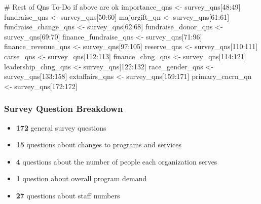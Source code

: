 \documentclass[
  letterpaper,
  DIV=11,
  numbers=noendperiod]{scrreprt}
\newenvironment{Shaded}{\begin{snugshade}}{\end{snugshade}}
\newcommand{\CommentTok}[1]{\textcolor[rgb]{0.37,0.37,0.37}{#1}}
\newcommand{\DecValTok}[1]{\textcolor[rgb]{0.68,0.00,0.00}{#1}}
\newcommand{\NormalTok}[1]{\textcolor[rgb]{0.00,0.23,0.31}{#1}}
\newcommand{\OtherTok}[1]{\textcolor[rgb]{0.00,0.23,0.31}{#1}}
\newcommand{\SpecialCharTok}[1]{\textcolor[rgb]{0.37,0.37,0.37}{#1}}
\providecommand{\tightlist}{%
  \setlength{\itemsep}{0pt}\setlength{\parskip}{0pt}}\usepackage{longtable,booktabs,array}
\begin{document}
\begin{Shaded}
\begin{Highlighting}[]
\CommentTok{\# Rest of Qns To{-}Do if above are ok}
\NormalTok{importance\_qns }\OtherTok{\textless{}{-}}\NormalTok{ survey\_qns[}\DecValTok{48}\SpecialCharTok{:}\DecValTok{49}\NormalTok{]}
\NormalTok{fundraise\_qns }\OtherTok{\textless{}{-}}\NormalTok{ survey\_qns[}\DecValTok{50}\SpecialCharTok{:}\DecValTok{60}\NormalTok{]}
\NormalTok{majorgift\_qn }\OtherTok{\textless{}{-}}\NormalTok{ survey\_qns[}\DecValTok{61}\SpecialCharTok{:}\DecValTok{61}\NormalTok{]}
\NormalTok{fundraise\_change\_qns }\OtherTok{\textless{}{-}}\NormalTok{ survey\_qns[}\DecValTok{62}\SpecialCharTok{:}\DecValTok{68}\NormalTok{]}
\NormalTok{fundraise\_donor\_qns }\OtherTok{\textless{}{-}}\NormalTok{ survey\_qns[}\DecValTok{69}\SpecialCharTok{:}\DecValTok{70}\NormalTok{]}
\NormalTok{finance\_fundraise\_qns }\OtherTok{\textless{}{-}}\NormalTok{ survey\_qns[}\DecValTok{71}\SpecialCharTok{:}\DecValTok{96}\NormalTok{]}
\NormalTok{finance\_revenue\_qns }\OtherTok{\textless{}{-}}\NormalTok{ survey\_qns[}\DecValTok{97}\SpecialCharTok{:}\DecValTok{105}\NormalTok{]}
\NormalTok{reserve\_qns }\OtherTok{\textless{}{-}}\NormalTok{ survey\_qns[}\DecValTok{110}\SpecialCharTok{:}\DecValTok{111}\NormalTok{]}
\NormalTok{carse\_qns }\OtherTok{\textless{}{-}}\NormalTok{ survey\_qns[}\DecValTok{112}\SpecialCharTok{:}\DecValTok{113}\NormalTok{]}
\NormalTok{finance\_chng\_qns }\OtherTok{\textless{}{-}}\NormalTok{ survey\_qns[}\DecValTok{114}\SpecialCharTok{:}\DecValTok{121}\NormalTok{]}
\NormalTok{leadership\_chng\_qns }\OtherTok{\textless{}{-}}\NormalTok{ survey\_qns[}\DecValTok{122}\SpecialCharTok{:}\DecValTok{132}\NormalTok{]}
\NormalTok{race\_gender\_qns }\OtherTok{\textless{}{-}}\NormalTok{ survey\_qns[}\DecValTok{133}\SpecialCharTok{:}\DecValTok{158}\NormalTok{]}
\NormalTok{extaffairs\_qns }\OtherTok{\textless{}{-}}\NormalTok{ survey\_qns[}\DecValTok{159}\SpecialCharTok{:}\DecValTok{171}\NormalTok{]}
\NormalTok{primary\_cncrn\_qn }\OtherTok{\textless{}{-}}\NormalTok{ survey\_qns[}\DecValTok{172}\SpecialCharTok{:}\DecValTok{172}\NormalTok{]}
\end{Highlighting}
\end{Shaded}

\hypertarget{survey-question-breakdown}{%
\subsubsection{Survey Question
Breakdown}\label{survey-question-breakdown}}

\begin{itemize}
\tightlist
\item
  \textbf{172} general survey questions
\item
  \textbf{15} questions about changes to programs and services
\item
  \textbf{4} questions about the number of people each organization
  serves
\item
  \textbf{1} question about overall program demand
\item
  \textbf{27} questions about staff numbers
\end{itemize}
\end{document}
